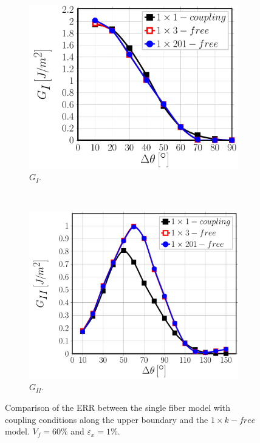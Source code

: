 \begin{figure}[!h]
\centering
    \begin{subfigure}[b]{0.45\textwidth}
        \includegraphics[width=\textwidth]{paperB/comparecouplingabovesidefibers-vf60-GI.pdf}
        \caption{$G_{I}$.}\label{paperB:subfig:comparisoncoupling60MI}
    \end{subfigure} ~
   \begin{subfigure}[b]{0.45\textwidth}
        \includegraphics[width=\textwidth]{paperB/comparecouplingabovesidefibers-vf60-GII.pdf}
        \caption{$G_{II}$.}\label{paperB:subfig:comparisoncoupling60MII}
    \end{subfigure}

\caption{Comparison of the ERR between the single fiber model with coupling conditions along the upper boundary and the $1\times k-free$ model. $V_{f}=60\%$ and $\varepsilon_{x}=1\%$.}\label{paperB:fig:comparisoncoupling}
\end{figure}

